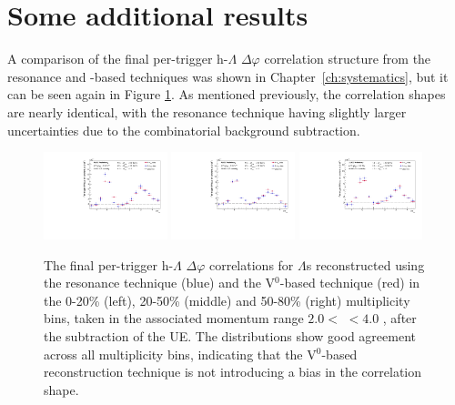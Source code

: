 \section{Some additional results}


A comparison of the final per-trigger h-$\Lambda$ $\Delta\varphi$ correlation structure from the resonance and \vz-based techniques was shown in Chapter~\ref{ch:systematics}, but it can be seen again in Figure \ref{fig:resonance_v0_dphi_comp_2}. As mentioned previously, the correlation shapes are nearly identical, with the resonance technique having slightly larger uncertainties due to the combinatorial background subtraction. 

\begin{figure}[h]
    \centering
    \includegraphics[width=0.32\textwidth]{figures/analysis/h_lambda_dphi_0_20_zeroed_rescomp.pdf}
    \includegraphics[width=0.32\textwidth]{figures/analysis/h_lambda_dphi_20_50_zeroed_rescomp.pdf}
    \includegraphics[width=0.32\textwidth]{figures/analysis/h_lambda_dphi_50_80_zeroed_rescomp.pdf}
    \caption{The final per-trigger h-$\Lambda$ $\Delta\varphi$ correlations for $\Lambda$s reconstructed using the resonance technique (blue) and the V$^{0}$-based technique (red) in the 0-20\% (left), 20-50\% (middle) and 50-80\% (right) multiplicity bins, taken in the associated momentum range $2.0 <$ \pt $< 4.0$ \GeVc, after the subtraction of the UE. The distributions show good agreement across all multiplicity bins, indicating that the V$^{0}$-based reconstruction technique is not introducing a bias in the correlation shape.}
    \label{fig:resonance_v0_dphi_comp_2}
\end{figure}

